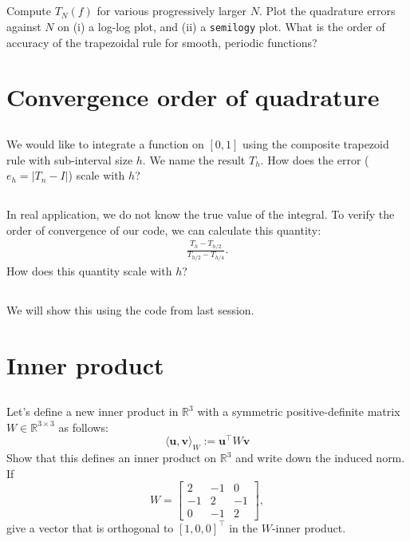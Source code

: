 \documentclass[11pt,letterpaper]{report}
\begin{document}
\subsection{}
Compute $T_N(f)$ for various progressively larger $N$. Plot the quadrature errors against $N$ on (i) a log-log plot, and (ii) a \texttt{semilogy} plot. What is the order of accuracy of the trapezoidal rule for smooth, periodic functions?

\section{Convergence order of quadrature}
\subsection{}
We would like to integrate a function on $[0,1]$ using the composite trapezoid rule with sub-interval size $h$. We name the result $T_h$. How does the error ($e_h = |T_n-I|$) scale with $h$?

\subsection{}
In real application, we do not know the true value of the integral. To verify the order of convergence of our code, we can calculate this quantity:
\begin{align*}
    \frac{T_h-T_{h/2}}{T_{h/2}-T_{h/4}}.
\end{align*}
How does this quantity scale with $h$?

\subsection{}
We will show this using the code from last session.

\section{Inner product}
\subsection{}
Let's define a new inner product in $\mathbb R^3$ with a symmetric
  positive-definite matrix $W\in \mathbb R^{3\times 3}$ as follows:
  $$
  \langle \boldsymbol u, \boldsymbol v\rangle_W := \boldsymbol u^\top W \boldsymbol v
  $$
  Show that this defines an inner product on $\mathbb R^3$ and write
  down the induced norm. If 
  $$W=\begin{bmatrix}2& -1& 0 \\ -1 & 2 & -1
  \\ 0 & -1 & 2 \end{bmatrix},$$
  give a vector that is orthogonal to
  $[1,0,0]^\top$ in the $W$-inner product.
\end{document}
